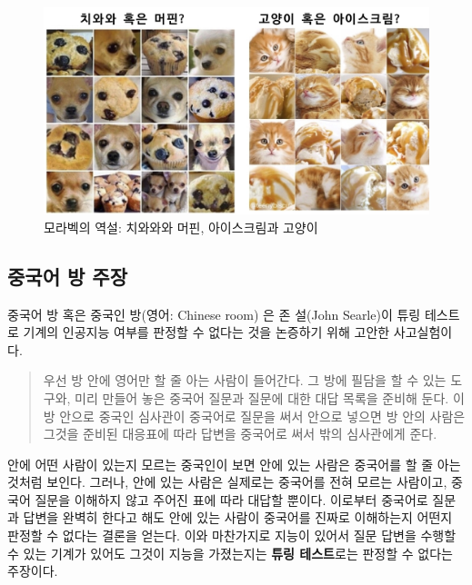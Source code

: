 \documentclass[smallextended]{svjour3}       %
\begin{document}
\begin{figure}

{\centering \includegraphics[width=1\linewidth]{fig/moravec-paradox} 

}

\caption{모라벡의 역설: 치와와와 머핀, 아이스크림과 고양이}\label{fig:unnamed-chunk-4}
\end{figure}

\hypertarget{chinese-room}{%
\subsection{중국어 방 주장}\label{chinese-room}}

중국어 방 혹은 중국인 방(영어: Chinese room) \cite{wikipedia_2019}은 존
설(John Searle)이 튜링 테스트로 기계의 인공지능 여부를 판정할 수 없다는
것을 논증하기 위해 고안한 사고실험이다.

\begin{quote}
우선 방 안에 영어만 할 줄 아는 사람이 들어간다. 그 방에 필담을 할 수
있는 도구와, 미리 만들어 놓은 중국어 질문과 질문에 대한 대답 목록을
준비해 둔다. 이 방 안으로 중국인 심사관이 중국어로 질문을 써서 안으로
넣으면 방 안의 사람은 그것을 준비된 대응표에 따라 답변을 중국어로 써서
밖의 심사관에게 준다.
\end{quote}

안에 어떤 사람이 있는지 모르는 중국인이 보면 안에 있는 사람은 중국어를
할 줄 아는 것처럼 보인다. 그러나, 안에 있는 사람은 실제로는 중국어를
전혀 모르는 사람이고, 중국어 질문을 이해하지 않고 주어진 표에 따라
대답할 뿐이다. 이로부터 중국어로 질문과 답변을 완벽히 한다고 해도 안에
있는 사람이 중국어를 진짜로 이해하는지 어떤지 판정할 수 없다는 결론을
얻는다. 이와 마찬가지로 지능이 있어서 질문 답변을 수행할 수 있는 기계가
있어도 그것이 지능을 가졌는지는 \textbf{튜링 테스트}로는 판정할 수
없다는 주장이다.
\end{document}
